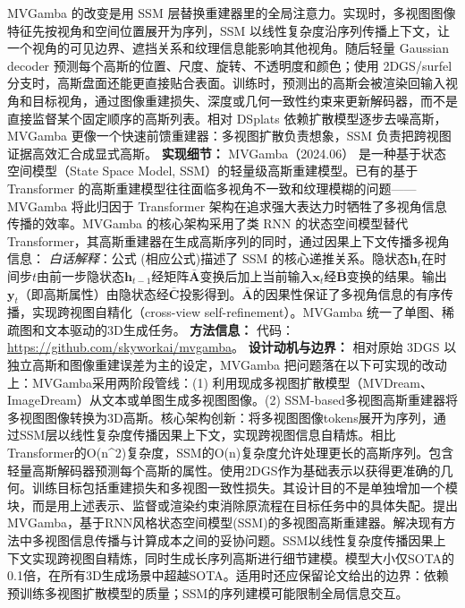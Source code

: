 MVGamba 的改变是用 SSM 层替换重建器里的全局注意力。实现时，多视图图像特征先按视角和空间位置展开为序列，SSM 以线性复杂度沿序列传播上下文，让一个视角的可见边界、遮挡关系和纹理信息能影响其他视角。随后轻量 Gaussian decoder 预测每个高斯的位置、尺度、旋转、不透明度和颜色；使用 2DGS/surfel 分支时，高斯盘面还能更直接贴合表面。训练时，预测出的高斯会被渲染回输入视角和目标视角，通过图像重建损失、深度或几何一致性约束来更新解码器，而不是直接监督某个固定顺序的高斯列表。相对 DSplats 依赖扩散模型逐步去噪高斯，MVGamba 更像一个快速前馈重建器：多视图扩散负责想象，SSM 负责把跨视图证据高效汇合成显式高斯。
\textbf{实现细节：} MVGamba（2024.06） 是一种基于状态空间模型（State Space Model, SSM）的轻量级高斯重建模型。已有的基于 Transformer 的高斯重建模型往往面临多视角不一致和纹理模糊的问题——MVGamba 将此归因于 Transformer 架构在追求强大表达力时牺牲了多视角信息传播的效率。MVGamba 的核心架构采用了类 RNN 的状态空间模型替代 Transformer，其高斯重建器在生成高斯序列的同时，通过因果上下文传播多视角信息： \textit{白话解释}：公式 (相应公式)描述了 SSM 的核心递推关系。隐状态$\mathbf{h}_t$在时间步$t$由前一步隐状态$\mathbf{h}_{t-1}$经矩阵$\bar{\mathbf{A}}$变换后加上当前输入$\mathbf{x}_t$经$\bar{\mathbf{B}}$变换的结果。输出$\mathbf{y}_t$（即高斯属性）由隐状态经$\bar{\mathbf{C}}$投影得到。$\bar{\mathbf{A}}$的因果性保证了多视角信息的有序传播，实现跨视图自精化（cross-view self-refinement）。MVGamba 统一了单图、稀疏图和文本驱动的3D生成任务。
\textbf{方法信息：} 代码：\url{https://github.com/skyworkai/mvgamba}。
\textbf{设计动机与边界：} 相对原始 3DGS 以独立高斯和图像重建误差为主的设定，MVGamba 把问题落在以下可实现的改动上：MVGamba采用两阶段管线：(1) 利用现成多视图扩散模型（MVDream、ImageDream）从文本或单图生成多视图图像。(2) SSM-based多视图高斯重建器将多视图图像转换为3D高斯。核心架构创新：将多视图图像tokens展开为序列，通过SSM层以线性复杂度传播因果上下文，实现跨视图信息自精炼。相比Transformer的O(n\^{}2)复杂度，SSM的O(n)复杂度允许处理更长的高斯序列。包含轻量高斯解码器预测每个高斯的属性。使用2DGS作为基础表示以获得更准确的几何。训练目标包括重建损失和多视图一致性损失。其设计目的不是单独增加一个模块，而是用上述表示、监督或渲染约束消除原流程在目标任务中的具体失配。提出MVGamba，基于RNN风格状态空间模型(SSM)的多视图高斯重建器。解决现有方法中多视图信息传播与计算成本之间的妥协问题。SSM以线性复杂度传播因果上下文实现跨视图自精炼，同时生成长序列高斯进行细节建模。模型大小仅SOTA的0.1倍，在所有3D生成场景中超越SOTA。适用时还应保留论文给出的边界：依赖预训练多视图扩散模型的质量；SSM的序列建模可能限制全局信息交互。

